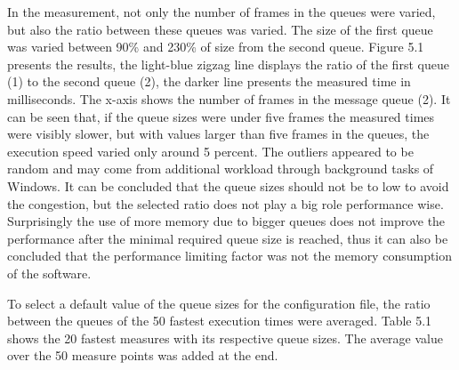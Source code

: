 In the measurement, not only the number of frames in the queues were varied, but also the ratio between these queues was varied. The size of the first queue was varied between 90\% and 230\% of size from the second queue. Figure 5.1 presents the results, the light-blue zigzag line displays the ratio of the first queue (1) to the second queue (2), the darker line presents the measured time in milliseconds. The x-axis shows the number of frames in the message queue (2). It can be seen that, if the queue sizes were under five frames the measured times were visibly slower, but with values larger than five frames in the queues, the execution speed varied only around 5 percent. The outliers appeared to be random and may come from additional workload through background tasks of Windows. It can be concluded that the queue sizes should not be to low to avoid the congestion, but the selected ratio does not play a big role performance wise. Surprisingly the use of more memory due to bigger queues does not improve the performance after the minimal required queue size is reached, thus it can also be concluded that the performance limiting factor was not the memory consumption of the software.

To select a default value of the queue sizes for the configuration file, the ratio between the queues of the 50 fastest execution times were averaged. Table 5.1 shows the 20 fastest measures with its respective queue sizes. The average value over the 50 measure points was added at the end. 


